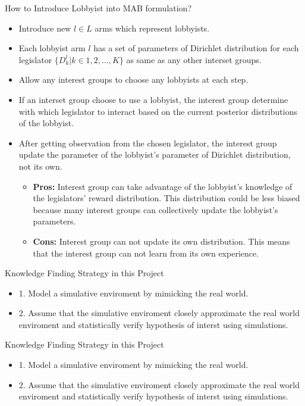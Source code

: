 \documentclass{beamer}
\begin{document}
	\begin{frame}{How to Introduce Lobbyist into MAB formulation?}
		\begin{itemize}
			\item Introduce new $l \in L$ arms which represent lobbyists.
			\item Each lobbyist arm $l$ has a set of parameters of Dirichlet distribution for each legislator $\{D_k^l | k \in 1, 2, \hdots, K \}$ as same as any other interset groups.
			\item Allow any interest groups to choose any lobbyists at each step. 
			\item If an interset group choose to use a lobbyist, the interest group determine with which legislator to interact based on the current posterior distributions of the lobbyist.
			\item After getting observation from the chosen legislator, the interest group update the parameter of the lobbyist's parameter of Dirichlet distribution, not its own.
				\begin{itemize}
					\item \textbf{Pros:} Interest group can take advantage of the lobbyist's knowledge of the legislators' reward distribution. This distribution could be less biased because many interest groups can collectively update the lobbyist's parameters.
					\item \textbf{Cons:} Interest group can not update its own distribution. This means that the interest group can not learn from its own experience.
				\end{itemize}  
		\end{itemize}
	\end{frame}

	\begin{frame}{Knowledge Finding Strategy in this Project}
		\begin{itemize}
			\item 1. Model a simulative enviroment by mimicking the real world.
			\item 2. Assume that the simulative enviroment closely approximate the real world enviroment and statistically verify hypothesis of interst using simulations.
		\end{itemize}
	\end{frame}


	\begin{frame}{Knowledge Finding Strategy in this Project}
		\begin{itemize}
			\item 1. Model a simulative enviroment by mimicking the real world.
			\item 2. Assume that the simulative enviroment closely approximate the real world enviroment and statistically verify hypothesis of interst using simulations.
		\end{itemize}
	\end{frame}
\end{document}
